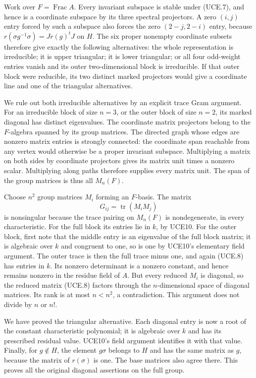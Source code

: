 Work over \(F=\operatorname{Frac}A\).  Every invariant subspace
is stable under (UCE.7), and hence is a coordinate subspace by
its three spectral projectors.  A zero \((i,j)\) entry forced
by such a subspace also forces the zero \((2-j,2-i)\) entry,
because
\(r(\sigma g^{-1}\sigma)=Jr(g)^tJ\) on \(H\).
The six proper nonempty coordinate subsets therefore give exactly
the following alternatives: the whole representation is irreducible;
it is upper triangular; it is lower triangular; or all four
odd-weight entries vanish and its outer two-dimensional block is
irreducible.  If that outer block were reducible, its two distinct
marked projectors would give a coordinate line and one of the
triangular alternatives.

We rule out both irreducible alternatives by an explicit trace
Gram argument.  For an irreducible block of size \(n=3\), or
the outer block of size \(n=2\), its marked diagonal has distinct
eigenvalues.  The coordinate matrix projectors belong to the
\(F\)-algebra spanned by its group matrices.  The directed graph
whose edges are nonzero matrix entries is strongly connected:
the coordinate span reachable from any vertex would otherwise be
a proper invariant subspace.  Multiplying a matrix on both sides
by coordinate projectors gives its matrix unit times a nonzero
scalar.  Multiplying along paths therefore supplies every matrix
unit.  The span of the group matrices is thus all \(M_n(F)\).

Choose \(n^2\) group matrices \(M_i\) forming an \(F\)-basis.
The matrix
\[
                     G_{ij}=\operatorname{tr}(M_iM_j)
 \tag{UCE.8}
\]
is nonsingular because the trace pairing on \(M_n(F)\) is
nondegenerate, in every characteristic.  For the full block its
entries lie in \(k\), by UCE10.  For the outer block, first note
that the middle entry is an eigenvalue of the full block matrix;
it is algebraic over \(k\) and congruent to one, so is one by
UCE10's elementary field argument.  The outer trace is then the
full trace minus one, and again (UCE.8) has entries in \(k\).
Its nonzero determinant is a nonzero constant, and hence remains
nonzero in the residue field of \(A\).  But every reduced \(M_i\)
is diagonal, so the reduced matrix (UCE.8) factors through the
\(n\)-dimensional space of diagonal matrices.  Its rank is at
most \(n<n^2\), a contradiction.  This argument does not divide
by \(n\) or \(n!\).

We have proved the triangular alternative.  Each diagonal entry
is now a root of the constant characteristic polynomial; it is
algebraic over \(k\) and has its prescribed residual value.
UCE10's field argument identifies it with that value.  Finally,
for \(g\notin H\), the element \(g\sigma\) belongs to
\(H\) and has the same matrix as \(g\), because the matrix
of \(r(\sigma)\) is one.  The base matrices also agree there.
This proves all the original diagonal assertions on the full group.

